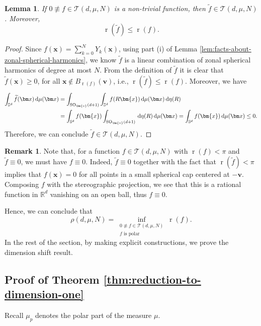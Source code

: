 \documentclass[reqno, a4paper]{amsart}
\def\R{\mathbb{R}}
\renewcommand{\d}{\text{\rm d}}
\newcommand{\Sd}{\mathbb{S}^d}
\newcommand{\x}{{\bm x}}
\renewcommand{\v}{{\bm v}}
\newcommand{\wt}{\widetilde}
\renewcommand{\r}{\operatorname{r}}
\theoremstyle{plain}
\newtheorem{lemma}[theorem]{Lemma}
\theoremstyle{definition}
\theoremstyle{remarkstyle}
\newtheorem*{remark}{Remark}
\numberwithin{equation}{section}
\begin{document}
\begin{lemma}\label{lem:symmetrization-of-enn-functions}
    If $0\not\equiv f\in \mathcal{T}(d, \mu, N)$ is a non-trivial function, then $\wt f\in \mathcal{T}(d, \mu, N)$. Moreover, $$\r(\wt f)\leq \r(f).$$
\end{lemma}
\begin{proof}
Since $f(\x)=\sum_{k=0}^{N} Y_k(\x)$, using part (i) of Lemma \ref{lem:facts-about-zonal-spherical-harmonics}, we know $\widetilde{f}$ is a linear combination of zonal spherical harmonics of degree at most $N$. From the definition of $\widetilde{f}$ it is clear that $\widetilde{f}(\x)\geq 0$, for all $\x \not\in B_{\r(f)}(\v)$, i.e., $\r(\wt f)\leq \r(f)$. Moreover, we have 
\begin{equation*}
\begin{split}
    \int_{\Sd} \widetilde{f}(\x) \,  \d\mu(\x)&
    = \int_{\mathrm{SO}_{\bm{v}}(d+1)} \int_{\Sd}  f(R\bm{x}) \,\d\mu(\x) \, \d\eta(R)\\
    &= \int_{\Sd}  f(\bm{x}) \int_{\mathrm{SO}_{\bm{v}}(d+1)}   \,\d\eta(R) \,\d\mu(\x)=\int_{\Sd}  f(\bm{x}) \,\d\mu(\x)\leq 0.
\end{split}
\end{equation*}
Therefore, we can conclude $\wt f\in \mathcal{T}(d, \mu, N)$.    
\end{proof}

\begin{remark}\label{rem:symmetrization not identically zero}
Note that, for a function $f\in \mathcal{T}(d, \mu, N)$ with $\r(f)<\pi$ and $\wt f\equiv 0$, we must have $f\equiv 0$.  Indeed, $\wt f\equiv 0$ together with the fact that $\r(\wt f)<\pi$ implies that $f(\x)=0$ for all points in a small spherical cap centered at $-\v$. Composing $f$ with the stereographic projection, we see that this is a rational function in $\R^d$ vanishing on an open ball, thus $f\equiv 0$. 
\end{remark}
Hence, we can conclude that 
\begin{equation*}
    \rho(d, \mu, N)=\inf_{\substack{0\not \equiv f\in \mathcal{T}(d, \mu, N)\\ f \text{ is polar }}} \r(f).
\end{equation*}
In the rest of the section, by making explicit constructions, we prove the dimension shift result.  
\subsection{Proof of Theorem \ref{thm:reduction-to-dimension-one}} Recall $\mu_p$ denotes the polar part of the measure $\mu$.
\end{document}
